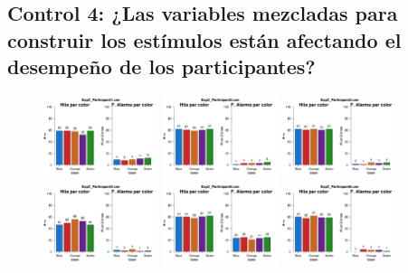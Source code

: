 \subsection{Control 4: ¿Las variables mezcladas para construir los estímulos están afectando el desempeño de los participantes?}

\begin{figure}[th]
\centering
\includegraphics[width=0.30\textwidth]{Figures/Color_Exp2_P1} \includegraphics[width=0.30\textwidth]{Figures/Color_Exp2_P2} \includegraphics[width=0.30\textwidth]{Figures/Color_Exp2_P3}
\includegraphics[width=0.30\textwidth]{Figures/Color_Exp2_P4} \includegraphics[width=0.30\textwidth]{Figures/Color_Exp2_P5} \includegraphics[width=0.30\textwidth]{Figures/Color_Exp2_P6}

\end{figure}
